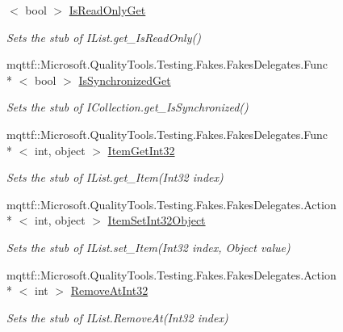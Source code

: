 \begin{DoxyCompactItemize}
$<$ bool $>$ \hyperlink{class_system_1_1_collections_1_1_fakes_1_1_stub_i_list_a45b3e53e965bf56e518d428850890cb1}{Is\-Read\-Only\-Get}
\begin{DoxyCompactList}\small\item\em Sets the stub of I\-List.\-get\-\_\-\-Is\-Read\-Only()\end{DoxyCompactList}\item 
mqttf\-::\-Microsoft.\-Quality\-Tools.\-Testing.\-Fakes.\-Fakes\-Delegates.\-Func\\*
$<$ bool $>$ \hyperlink{class_system_1_1_collections_1_1_fakes_1_1_stub_i_list_ab48b0f77e4a98b8a3a7fc3a9ff9ebc3e}{Is\-Synchronized\-Get}
\begin{DoxyCompactList}\small\item\em Sets the stub of I\-Collection.\-get\-\_\-\-Is\-Synchronized()\end{DoxyCompactList}\item 
mqttf\-::\-Microsoft.\-Quality\-Tools.\-Testing.\-Fakes.\-Fakes\-Delegates.\-Func\\*
$<$ int, object $>$ \hyperlink{class_system_1_1_collections_1_1_fakes_1_1_stub_i_list_acb0f7d09c7f1dd11fda98c871b3077fa}{Item\-Get\-Int32}
\begin{DoxyCompactList}\small\item\em Sets the stub of I\-List.\-get\-\_\-\-Item(\-Int32 index)\end{DoxyCompactList}\item 
mqttf\-::\-Microsoft.\-Quality\-Tools.\-Testing.\-Fakes.\-Fakes\-Delegates.\-Action\\*
$<$ int, object $>$ \hyperlink{class_system_1_1_collections_1_1_fakes_1_1_stub_i_list_a0e2ef2178c3988aed30aacd00df879da}{Item\-Set\-Int32\-Object}
\begin{DoxyCompactList}\small\item\em Sets the stub of I\-List.\-set\-\_\-\-Item(\-Int32 index, Object value)\end{DoxyCompactList}\item 
mqttf\-::\-Microsoft.\-Quality\-Tools.\-Testing.\-Fakes.\-Fakes\-Delegates.\-Action\\*
$<$ int $>$ \hyperlink{class_system_1_1_collections_1_1_fakes_1_1_stub_i_list_ab84925b439d13a226a27b2cc191a3a2d}{Remove\-At\-Int32}
\begin{DoxyCompactList}\small\item\em Sets the stub of I\-List.\-Remove\-At(\-Int32 index)\end{DoxyCompactList}\item 

\end{DoxyCompactItemize}
